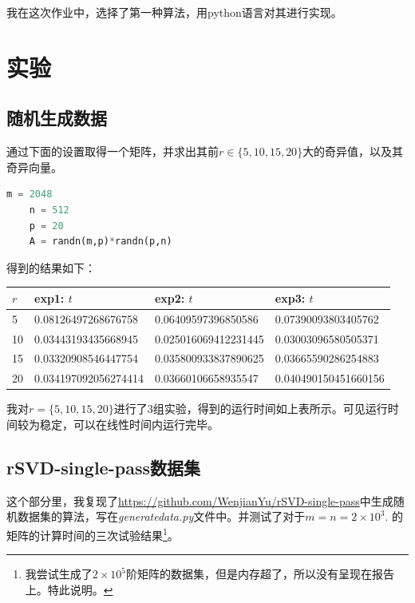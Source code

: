 \documentclass[12pt,letterpaper]{article}
\begin{document}
我在这次作业中，选择了第一种算法，用python语言对其进行实现。

\section*{实验}

\subsection*{随机生成数据}

通过下面的设置取得一个矩阵，并求出其前$r\in\{5,10,15,20\}$大的奇异值，以及其奇异向量。

\begin{lstlisting}[language={python}]
    m = 2048
    n = 512
    p = 20
    A = randn(m,p)*randn(p,n)
\end{lstlisting}

得到的结果如下：

\begin{table}[h]
\centering
\begin{tabular}{|l|l|l|l|}
\hline
$r$ & exp1: $t$ & exp2: $t$ & exp3: $t$\\ \hline
 5 &    0.08126497268676758  &  0.06409597396850586   & 0.07390093803405762 \\ \hline
10 &   0.03443193435668945   & 0.025016069412231445 & 0.03003096580505371
\\ \hline
15 & 0.03320908546447754 &   0.035800933837890625  & 0.03665590286254883
  \\ \hline
20 & 0.034197092056274414 & 0.03660106658935547 & 0.040490150451660156 \\ \hline
\end{tabular}
\end{table}

我对$r=\{5,10,15,20\}$进行了3组实验，得到的运行时间如上表所示。可见运行时间较为稳定，可以在线性时间内运行完毕。

\subsection*{rSVD-single-pass数据集}

这个部分里，我复现了\url{https://github.com/WenjianYu/rSVD-single-pass}中生成随机数据集的算法，写在\emph{generatedata.py}文件中。并测试了对于$m = n = 2\times 10^3.$ 的矩阵的计算时间的三次试验结果\footnote{我尝试生成了$2\times 10^5$阶矩阵的数据集，但是内存超了，所以没有呈现在报告上。特此说明。}。
\end{document}
